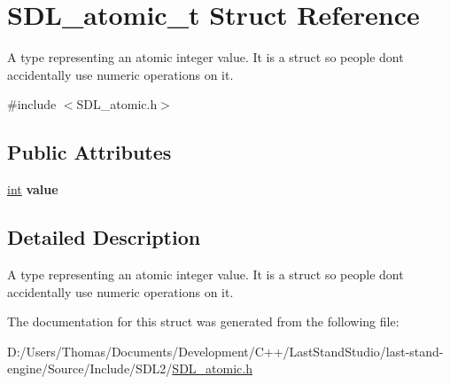 \hypertarget{structSDL__atomic__t}{}\section{S\+D\+L\+\_\+atomic\+\_\+t Struct Reference}
\label{structSDL__atomic__t}


A type representing an atomic integer value. It is a struct so people don\textquotesingle{}t accidentally use numeric operations on it.  




{\ttfamily \#include $<$S\+D\+L\+\_\+atomic.\+h$>$}

\subsection*{Public Attributes}
\begin{DoxyCompactItemize}
\item 
\hypertarget{structSDL__atomic__t_a0d09ddf3cc5798c709edb7cea104203a}{}\hyperlink{SDL__thread_8h_a6a64f9be4433e4de6e2f2f548cf3c08e}{int} {\bfseries value}\label{structSDL__atomic__t_a0d09ddf3cc5798c709edb7cea104203a}

\end{DoxyCompactItemize}


\subsection{Detailed Description}
A type representing an atomic integer value. It is a struct so people don\textquotesingle{}t accidentally use numeric operations on it. 

The documentation for this struct was generated from the following file\+:\begin{DoxyCompactItemize}
\item 
D\+:/\+Users/\+Thomas/\+Documents/\+Development/\+C++/\+Last\+Stand\+Studio/last-\/stand-\/engine/\+Source/\+Include/\+S\+D\+L2/\hyperlink{SDL__atomic_8h}{S\+D\+L\+\_\+atomic.\+h}\end{DoxyCompactItemize}
